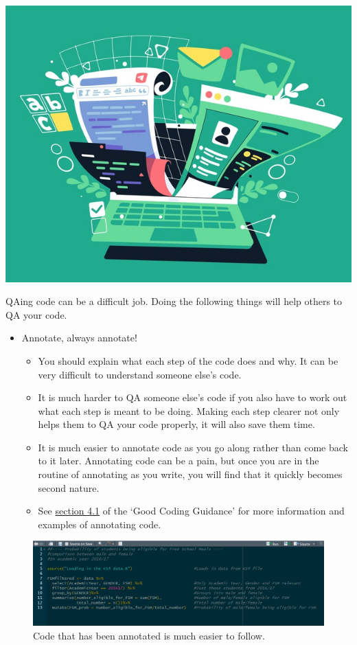 \documentclass[
]{article}
\providecommand{\tightlist}{%
  \setlength{\itemsep}{0pt}\setlength{\parskip}{0pt}}
\begin{document}
\includegraphics{pictures/code_pic.jpg}

QAing code can be a difficult job. Doing the following things will help others to QA your code.

\begin{itemize}
\tightlist
\item
  Annotate, always annotate!

  \begin{itemize}
  \tightlist
  \item
    You should explain what each step of the code does and why. It can be very difficult to understand someone else's code.
  \item
    It is much harder to QA someone else's code if you also have to work out what each step is meant to be doing. Making each step clearer not only helps them to QA your code properly, it will also save them time.
  \item
    It is much easier to annotate code as you go along rather than come back to it later. Annotating code can be a pain, but once you are in the routine of annotating as you write, you will find that it quickly becomes second nature.
  \item
    See \href{https://dfe-analytical-services.github.io/good-code-practice/good.html\#descriptive-and-informative-comments}{section 4.1} of the `Good Coding Guidance' for more information and examples of annotating code.
  \end{itemize}
\end{itemize}

\begin{figure}
\centering
\includegraphics{pictures/code-example.png}
\caption{Code that has been annotated is much easier to follow.}
\end{figure}
\end{document}
